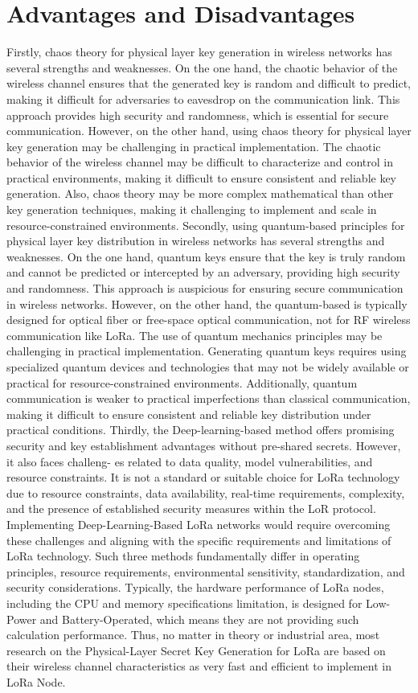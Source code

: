 \section{Advantages and Disadvantages}
Firstly, chaos theory for physical layer key generation in wireless networks has several strengths and weaknesses. On the one hand, the chaotic behavior of the wireless channel ensures that the generated key is random and difficult to predict, making it difficult for adversaries to eavesdrop on the communication link. This approach provides high security and randomness, which is essential for secure communication. However, on the other hand, using chaos theory for physical layer key generation may be challenging in practical implementation. The chaotic behavior of the wireless channel may be difficult to characterize and control in practical environments, making it difficult to ensure consistent and reliable key generation. Also, chaos theory may be more complex mathematical than other key generation techniques, making it challenging to implement and scale in resource-constrained environments.
Secondly, using quantum-based principles for physical layer key distribution in wireless networks has several strengths and weaknesses. On the one hand, quantum keys ensure that the key is truly random and cannot be predicted or intercepted by an adversary, providing high security and randomness. This approach is auspicious for ensuring secure communication in wireless networks. However, on the other hand, the quantum-based is typically designed for optical fiber or free-space optical communication, not for RF wireless communication like LoRa. The use of quantum mechanics principles may be challenging in practical implementation. Generating quantum keys requires using specialized quantum devices and technologies that may not be widely available or practical for resource-constrained environments. Additionally, quantum communication is weaker to practical imperfections than classical communication, making it difficult to ensure consistent and reliable key distribution under practical conditions. 
Thirdly, the Deep-learning-based method offers promising security and key establishment advantages without pre-shared secrets. However, it also faces challeng-
es related to data quality, model vulnerabilities, and resource constraints. It is not a standard or suitable choice for LoRa technology due to resource constraints, data availability, real-time requirements, complexity, and the presence of established security measures within the LoR protocol. Implementing Deep-Learning-Based LoRa networks would require overcoming these challenges and aligning with the specific requirements and limitations of LoRa technology.
Such three methods fundamentally differ in operating principles, resource requirements, environmental sensitivity, standardization, and security considerations. Typically, the hardware performance of LoRa nodes, including the CPU and memory specifications limitation, is designed for Low-Power and Battery-Operated, which means they are not providing such calculation performance.
Thus, no matter in theory or industrial area, most research on the Physical-Layer Secret Key Generation for LoRa are based on their wireless channel characteristics as very fast and efficient to implement in LoRa Node.

